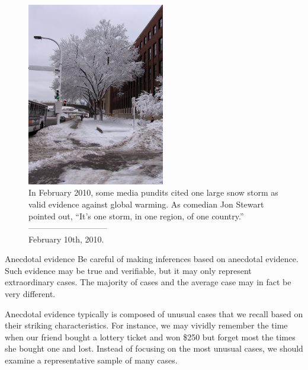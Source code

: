 \setlength{\captionwidth}{\textwidth-80mm}
\begin{figure}
\centering
\hspace{8mm}\includegraphics[width=60mm]{ch_data_collection/figures/mnWinter/mnWinter}\hspace{4mm}
\begin{minipage}[b]{\textwidth - 80mm}
   \caption[anecdotal evidence]{In February 2010, some media pundits cited one large snow storm as valid evidence against global warming. As comedian Jon Stewart pointed out, ``It's one storm, in one region, of one country.''\vspace{-4.5mm} \\

   -----------------------------\vspace{-2mm}\\
   {\footnotesize February 10th, 2010.}
   \label{mnWinter}}
\end{minipage}
\end{figure}
\setlength{\captionwidth}{\mycaptionwidth}

\begin{onebox}{Anecdotal evidence}
Be careful of making inferences based on anecdotal evidence. Such evidence may be true and verifiable, but it may only represent extraordinary cases. The majority of cases and the average case may in fact be very different.\end{onebox}

Anecdotal evidence typically is composed of unusual cases that we recall based on their striking characteristics. For instance, we may vividly remember the time when our friend bought a lottery ticket and won \$250 but forget most the times she bought one and lost. Instead of focusing on the most unusual cases, we should examine a representative sample of many cases.


